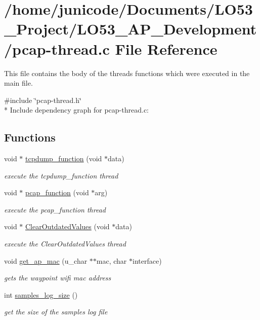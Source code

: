 \hypertarget{pcap-thread_8c}{}\section{/home/junicode/\+Documents/\+L\+O53\+\_\+\+Project/\+L\+O53\+\_\+\+A\+P\+\_\+\+Development/pcap-\/thread.c File Reference}
\label{pcap-thread_8c}


This file contains the body of the threads functions which were executed in the main file.  


{\ttfamily \#include \char`\"{}pcap-\/thread.\+h\char`\"{}}\\*
Include dependency graph for pcap-\/thread.c\+:
\subsection*{Functions}
\begin{DoxyCompactItemize}
\item 
void $\ast$ \hyperlink{pcap-thread_8c_a80533e12c13720352712455e86eac14d}{tcpdump\+\_\+function} (void $\ast$data)
\begin{DoxyCompactList}\small\item\em execute the tcpdump\+\_\+function thread \end{DoxyCompactList}\item 
void $\ast$ \hyperlink{pcap-thread_8c_aa6cca3d417df0d64edcfbfaa2f445aab}{pcap\+\_\+function} (void $\ast$arg)
\begin{DoxyCompactList}\small\item\em execute the pcap\+\_\+function thread \end{DoxyCompactList}\item 
void $\ast$ \hyperlink{pcap-thread_8c_aa7fbc627d49703073084fc66e79ef7c0}{Clear\+Outdated\+Values} (void $\ast$data)
\begin{DoxyCompactList}\small\item\em execute the Clear\+Outdated\+Values thread \end{DoxyCompactList}\item 
void \hyperlink{pcap-thread_8c_af7e8fb860db3c87ed3bec362216a5c7c}{get\+\_\+ap\+\_\+mac} (u\+\_\+char $\ast$$\ast$mac, char $\ast$interface)
\begin{DoxyCompactList}\small\item\em gets the waypoint wifi mac address \end{DoxyCompactList}\item 
int \hyperlink{pcap-thread_8c_a70cd3fb82216b3537d8691fcbd6dee10}{samples\+\_\+log\+\_\+size} ()
\begin{DoxyCompactList}\small\item\em get the size of the samples log file \end{DoxyCompactList}\end{DoxyCompactItemize}
